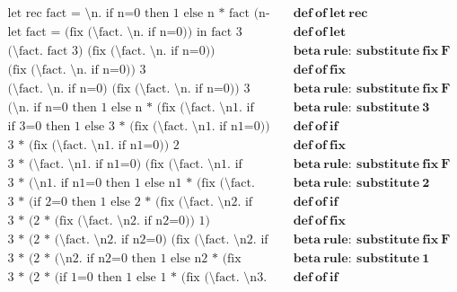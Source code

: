 \documentclass{article}
\theoremstyle{theorem}
\theoremstyle{definition}
\theoremstyle{remark}
\begin{document}
\begin{align*}
  \text{let rec fact = \textbackslash n. if n=0 then 1 else n * fact (n-1) in fact 3} & \quad \mathbf{def\ of\ let\ rec} \\
  \text{let fact = (fix (\textbackslash fact. \textbackslash n. if n=0)) in fact 3} & \quad \mathbf{def\ of\ let} \\
  \text{(\textbackslash fact. fact 3) (fix (\textbackslash fact. \textbackslash n. if n=0))} & \quad \mathbf{beta\ rule:\ substitute\ fix\ F} \\
  \text{(fix (\textbackslash fact. \textbackslash n. if n=0)) 3} & \quad \mathbf{def\ of\ fix} \\
  \text{(\textbackslash fact. \textbackslash n. if n=0) (fix (\textbackslash fact. \textbackslash n. if n=0)) 3} & \quad \mathbf{beta\ rule:\ substitute\ fix\ F} \\
  \text{(\textbackslash n. if n=0 then 1 else n * (fix (\textbackslash fact. \textbackslash n1. if n1=0)) (n-1)) 3} & \quad \mathbf{beta\ rule:\ substitute\ 3} \\
  \text{if 3=0 then 1 else 3 * (fix (\textbackslash fact. \textbackslash n1. if n1=0)) (3-1)} & \quad \mathbf{def\ of\ if} \\
  \text{3 * (fix (\textbackslash fact. \textbackslash n1. if n1=0)) 2} & \quad \mathbf{def\ of\ fix} \\
  \text{3 * (\textbackslash fact. \textbackslash n1. if n1=0) (fix (\textbackslash fact. \textbackslash n1. if n1=0)) 2} & \quad \mathbf{beta\ rule:\ substitute\ fix\ F} \\
  \text{3 * (\textbackslash n1. if n1=0 then 1 else n1 * (fix (\textbackslash fact. \textbackslash n2. if n2=0)) (n1-1)) 2} & \quad \mathbf{beta\ rule:\ substitute\ 2} \\
  \text{3 * (if 2=0 then 1 else 2 * (fix (\textbackslash fact. \textbackslash n2. if n2=0)) (2-1))} & \quad \mathbf{def\ of\ if} \\
  \text{3 * (2 * (fix (\textbackslash fact. \textbackslash n2. if n2=0)) 1)} & \quad \mathbf{def\ of\ fix} \\
  \text{3 * (2 * (\textbackslash fact. \textbackslash n2. if n2=0) (fix (\textbackslash fact. \textbackslash n2. if n2=0)) 1)} & \quad \mathbf{beta\ rule:\ substitute\ fix\ F} \\
  \text{3 * (2 * (\textbackslash n2. if n2=0 then 1 else n2 * (fix (\textbackslash fact. \textbackslash n3. if n3=0)) (n2-1)) 1)} & \quad \mathbf{beta\ rule:\ substitute\ 1} \\
  \text{3 * (2 * (if 1=0 then 1 else 1 * (fix (\textbackslash fact. \textbackslash n3. if n3=0)) (1-1)))} & \quad \mathbf{def\ of\ if} \\

\end{align*}
\end{document}
